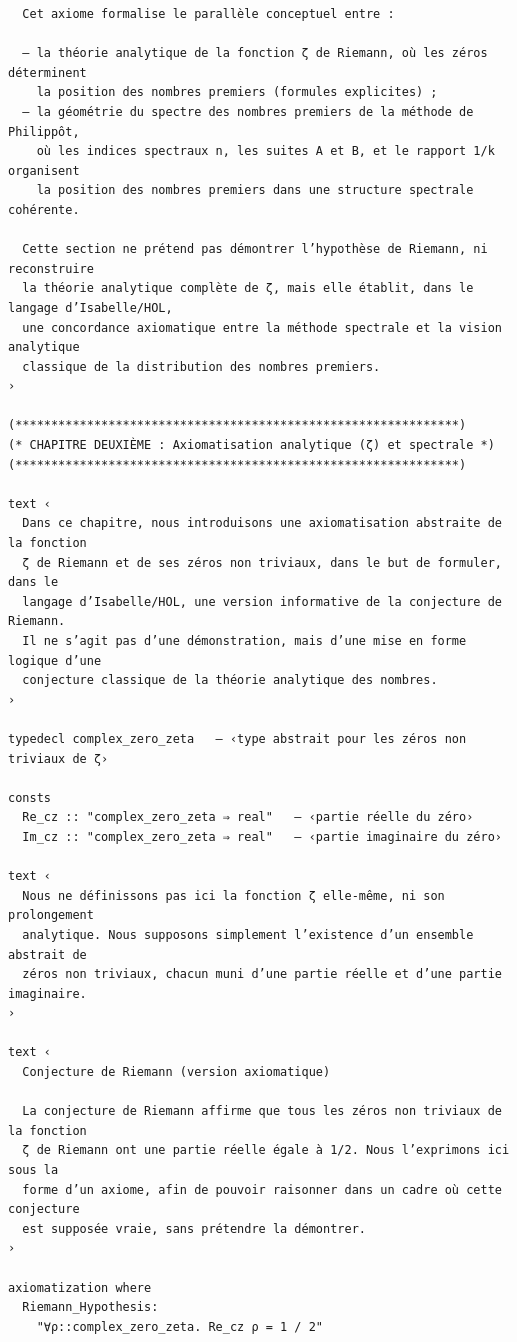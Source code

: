 \documentclass[a4paper,11pt]{article}
\begin{document}
\begin{holcode}[title={\textcolor{white}{File: methode\_spectral.thy -- Part 1/4}}]
\begin{lstlisting}
  Cet axiome formalise le parallèle conceptuel entre :

  – la théorie analytique de la fonction ζ de Riemann, où les zéros déterminent
    la position des nombres premiers (formules explicites) ;
  – la géométrie du spectre des nombres premiers de la méthode de Philippôt,
    où les indices spectraux n, les suites A et B, et le rapport 1/k organisent
    la position des nombres premiers dans une structure spectrale cohérente.

  Cette section ne prétend pas démontrer l’hypothèse de Riemann, ni reconstruire
  la théorie analytique complète de ζ, mais elle établit, dans le langage d’Isabelle/HOL,
  une concordance axiomatique entre la méthode spectrale et la vision analytique
  classique de la distribution des nombres premiers.
›

(**************************************************************)
(* CHAPITRE DEUXIÈME : Axiomatisation analytique (ζ) et spectrale *)
(**************************************************************)

text ‹
  Dans ce chapitre, nous introduisons une axiomatisation abstraite de la fonction
  ζ de Riemann et de ses zéros non triviaux, dans le but de formuler, dans le
  langage d’Isabelle/HOL, une version informative de la conjecture de Riemann.
  Il ne s’agit pas d’une démonstration, mais d’une mise en forme logique d’une
  conjecture classique de la théorie analytique des nombres.
›

typedecl complex_zero_zeta   ― ‹type abstrait pour les zéros non triviaux de ζ›

consts
  Re_cz :: "complex_zero_zeta ⇒ real"   ― ‹partie réelle du zéro›
  Im_cz :: "complex_zero_zeta ⇒ real"   ― ‹partie imaginaire du zéro›

text ‹
  Nous ne définissons pas ici la fonction ζ elle-même, ni son prolongement
  analytique. Nous supposons simplement l’existence d’un ensemble abstrait de
  zéros non triviaux, chacun muni d’une partie réelle et d’une partie imaginaire.
›

text ‹
  Conjecture de Riemann (version axiomatique)

  La conjecture de Riemann affirme que tous les zéros non triviaux de la fonction
  ζ de Riemann ont une partie réelle égale à 1/2. Nous l’exprimons ici sous la
  forme d’un axiome, afin de pouvoir raisonner dans un cadre où cette conjecture
  est supposée vraie, sans prétendre la démontrer.
›

axiomatization where
  Riemann_Hypothesis:
    "∀ρ::complex_zero_zeta. Re_cz ρ = 1 / 2"


\end{lstlisting}
\end{holcode}
\end{document}
